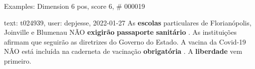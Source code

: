 \begin{frame}{Examples: Dimension 6 pos, score 6, \# 000019}
\footnotesize
\begin{exampleblock}{text: t024939, user: depjesse, 2022-01-27}
As \textbf{escolas} particulares de Florianópolis, Joinville e Blumenau NÃO 
\textbf{exigirão} \textbf{passaporte} \textbf{sanitário} . As instituições 
afirmam que seguirão as diretrizes do Governo do Estado. A vacina da Covid-19 
NÃO está incluída na caderneta de vacinação \textbf{obrigatória} . A 
\textbf{liberdade} vem primeiro. 
\end{exampleblock}
\end{frame}
